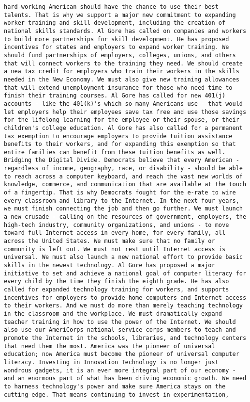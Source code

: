 \documentclass[
]{article}
\begin{document}
\begin{verbatim}
hard-working American should have the chance to use their best talents. That is why we support a major new commitment to expanding worker training and skill development, including the creation of national skills standards. Al Gore has called on companies and workers to build more partnerships for skill development. He has proposed incentives for states and employers to expand worker training. We should fund partnerships of employers, colleges, unions, and others that will connect workers to the training they need. We should create a new tax credit for employers who train their workers in the skills needed in the New Economy. We must also give new training allowances that will extend unemployment insurance for those who need time to finish their training courses. Al Gore has called for new 401(j) accounts - like the 401(k)'s which so many Americans use - that would let employers help their employees save tax free and use those savings for the lifelong learning for the employee or their spouse, or their children's college education. Al Gore has also called for a permanent tax exemption to encourage employers to provide tuition assistance benefits to their workers, and for expanding this exemption so that entire families can benefit from these tuition benefits as well. Bridging the Digital Divide. Democrats believe that every American - regardless of income, geography, race, or disability - should be able to reach across a computer keyboard, and reach the vast new worlds of knowledge, commerce, and communication that are available at the touch of a fingertip. That is why Democrats fought for the e-rate to wire every classroom and library to the Internet. In the next four years, we must finish connecting the job and then go further. We must launch a new crusade - calling on the resources of government, employers, the high-tech industry, community organizations, and unions - to move toward full Internet access in every home, for every family, all across the United States. We must make sure that no family or community is left out. We must not rest until Internet access is universal. We must also launch a new national effort to provide basic skills in the newest technology. Al Gore has proposed a major initiative to set and achieve a national goal of computer literacy for every child by the time they finish the eighth grade. He has also called for expanded technology training for workers, and supports incentives for employers to provide home computers and Internet access to their workers. And we must do more than merely teaching technology in the classroom and the workplace. We must dramatically expand teacher training in how to use the power of the Internet. We should also use our AmeriCorps national service corps members to teach and promote the Internet in the schools, libraries, and technology centers that need them the most. America was the pioneer of universal education; now America must become the pioneer of universal computer literacy. Investing in Innovation Technology is no longer just wondrous gadgets, it is an ever more integral part of our economy - and an enormous part of what has been driving economic growth. We need to harness technology's power and make sure America stays on the cutting-edge. That means continuing to invest in experimentation, 
\end{verbatim}
\end{document}
